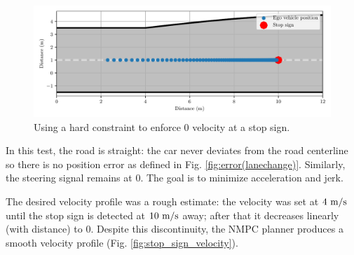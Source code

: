 \documentclass[letterpaper, 10 pt, conference]{ieeeconf}  %
\begin{document}
 
\begin{figure}[h!]
	\centering
	\includegraphics[width=1.0\linewidth]{figures/stop_sign.pdf}
	 	\vspace{-1.5em}
	\caption{Using a hard constraint to enforce 0 velocity at a stop sign.}
		\label{fig:stop_sign}
\end{figure}
 
% 
 In this test, the road is straight: the car never deviates from the road centerline so there is no position error as defined in Fig. \ref{fig:error(lanechange)}. Similarly, the steering signal remains at 0. The goal is to minimize acceleration and jerk.
 
The desired velocity profile was a rough estimate: the velocity was set at $4\ \text{m}/\text{s}$ until the stop sign is detected at $10\ \text{m}/\text{s}$ away; after that it decreases linearly (with distance) to 0. Despite this discontinuity, the NMPC planner produces a smooth velocity profile (Fig. \ref{fig:stop_sign_velocity}).
\end{document}
